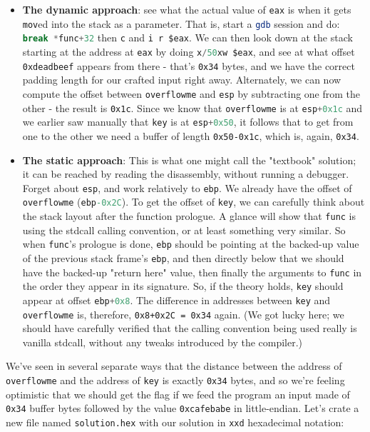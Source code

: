 \documentclass{article}
\newcommand{\xcode}[2]{\colorbox{ubuntuback}{\lstinline[language=#1]|#2|}}
\newcommand{\asm}[1]{\xcode{{[x86masm]assembler}}{#1}}
\newcommand{\code}[1]{\colorbox{ubuntuback}{\texttt{#1}}}
\newcommand{\gdb}[1]{\xcode{C}{#1}}
\begin{document}
\begin{itemize}
    \item \textbf{The dynamic approach}: see what the actual value of \asm{eax} is when it gets \asm{mov}ed into the stack as a parameter. That is, start a \xcode{bash}{gdb} session and do: \gdb{break *func+32} then \gdb{c} and \gdb{i r $eax}. We can then look down at the stack starting at the address at \gdb{eax} by doing \gdb{x/50xw $eax}, and see at what offset \code{0xdeadbeef} appears from there - that's \code{0x34} bytes, and we have the correct padding length for our crafted input right away. Alternately, we can now compute the offset between \xcode{C}{overflowme} and \asm{esp} by subtracting one from the other - the result is \code{0x1c}. Since we know that \xcode{C}{overflowme} is at \gdb{esp+0x1c} and we earlier saw manually that \xcode{C}{key} is at \gdb{esp+0x50}, it follows that to get from one to the other we need a buffer of length \code{0x50-0x1c}, which is, again, \code{0x34}.   
    \item \textbf{The static approach}: This is what one might call the "textbook" solution; it can be reached by reading the disassembly, without running a debugger. Forget about \asm{esp}, and work relatively to \asm{ebp}. We already have the offset of \xcode{C}{overflowme} (\gdb{ebp-0x2C}). To get the offset of \xcode{C}{key}, we can carefully think about the stack layout after the function prologue. A glance will show that \xcode{C}{func} is using the stdcall calling convention, or at least something very similar. So when \xcode{C}{func}'s prologue is done, \asm{ebp} should be pointing at the backed-up value of the previous stack frame's \asm{ebp}, and then directly below that we should have the backed-up "return here" value, then finally the arguments to \xcode{C}{func} in the order they appear in its signature. So, if the theory holds, \xcode{C}{key} should appear at offset \gdb{ebp+0x8}. The difference in addresses between \xcode{C}{key} and \xcode{C}{overflowme} is, therefore, \code{0x8+0x2C = 0x34} again. (We got lucky here; we should have carefully verified that the calling convention being used really is vanilla stdcall, without any tweaks introduced by the compiler.)
\end{itemize}

We've seen in several separate ways that the distance between the address of \xcode{C}{overflowme} and the address of \xcode{C}{key} is exactly \code{0x34} bytes, and so we're feeling optimistic that we should get the flag if we feed the program an input made of \code{0x34} buffer bytes followed by the value \code{0xcafebabe} in little-endian. Let's crate a new file named \code{solution.hex} with our solution in \xcode{bash}{xxd} hexadecimal notation:
\end{document}
